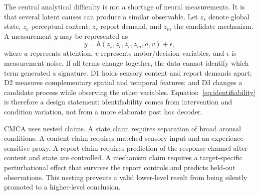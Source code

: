 \documentclass[conference]{IEEEtran}
\begin{document}
The central analytical difficulty is not a shortage of neural measurements. It is that several latent causes can produce a similar observable. Let $z_s$ denote global state, $z_c$ perceptual content, $z_r$ report demand, and $z_m$ the candidate mechanism. A measurement $y$ may be represented as
\begin{equation}
y=h(z_s,z_c,z_r,z_m,a,v)+\epsilon,
\label{eq:identifiability}
\end{equation}
where $a$ represents attention, $v$ represents motor/decision variables, and $\epsilon$ is measurement noise. If all terms change together, the data cannot identify which term generated a signature. D1 holds sensory content and report demands apart; D2 measures complementary spatial and temporal features; and D3 changes a candidate process while observing the other variables. Equation~\eqref{eq:identifiability} is therefore a design statement: identifiability comes from intervention and condition variation, not from a more elaborate post hoc decoder.

CMCA uses nested claims. A state claim requires separation of broad arousal conditions. A content claim requires matched sensory input and an experience-sensitive proxy. A report claim requires prediction of the response channel after content and state are controlled. A mechanism claim requires a target-specific perturbational effect that survives the report controls and predicts held-out observations. This nesting prevents a valid lower-level result from being silently promoted to a higher-level conclusion.
\end{document}

